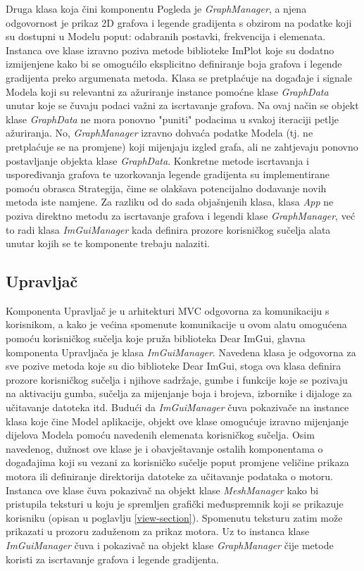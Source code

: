 \documentclass[times, utf8, diplomski]{fer}
\begin{document}
Druga klasa koja čini komponentu Pogleda je \textit{GraphManager}, a njena odgovornost je prikaz 2D grafova i legende gradijenta s obzirom na podatke koji su dostupni u Modelu poput: odabranih postavki, frekvencija i elemenata. Instanca ove klase izravno poziva metode biblioteke ImPlot koje su dodatno izmijenjene kako bi se omogućilo eksplicitno definiranje boja grafova i legende gradijenta preko argumenata metoda. Klasa se pretplaćuje na događaje i signale Modela koji su relevantni za ažuriranje instance pomoćne klase \textit{GraphData} unutar koje se čuvaju podaci važni za iscrtavanje grafova. Na ovaj način se objekt klase \textit{GraphData} ne mora ponovno "puniti" podacima u svakoj iteraciji petlje ažuriranja. No, \textit{GraphManager} izravno dohvaća podatke Modela (tj. ne pretplaćuje se na promjene) koji mijenjaju izgled grafa, ali ne zahtjevaju ponovno postavljanje objekta klase \textit{GraphData}. Konkretne metode iscrtavanja i uspoređivanja grafova te uzorkovanja legende gradijenta su implementirane pomoću obrasca Strategija, čime se olakšava potencijalno dodavanje novih metoda iste namjene. Za razliku od do sada objašnjenih klasa, klasa \textit{App} ne poziva direktno metodu za iscrtavanje grafova i legendi klase \textit{GraphManager}, već to radi klasa \textit{ImGuiManager} kada definira prozore korisničkog sučelja alata unutar kojih se te komponente trebaju nalaziti.\\

\subsection{Upravljač}

Komponenta Upravljač je u arhitekturi MVC odgovorna za komunikaciju s korisnikom, a kako je većina spomenute komunikacije u ovom alatu omogućena pomoću korisničkog sučelja koje pruža biblioteka Dear ImGui, glavna komponenta Upravljača je klasa \textit{ImGuiManager}. Navedena klasa je odgovorna za sve pozive metoda koje su dio biblioteke Dear ImGui, stoga ova klasa definira prozore korisničkog sučelja i njihove sadržaje, gumbe i funkcije koje se pozivaju na aktivaciju gumba, sučelja za mijenjanje boja i brojeva, izbornike i dijaloge za učitavanje datoteka itd. Budući da \textit{ImGuiManager} čuva pokazivače na instance klasa koje čine Model aplikacije, objekt ove klase omogućuje izravno mijenjanje dijelova Modela pomoću navedenih elemenata korisničkog sučelja. Osim navedenog, dužnost ove klase je i obavještavanje ostalih komponentama o događajima koji su vezani za korisničko sučelje poput promjene veličine prikaza motora ili definiranje direktorija datoteke za učitavanje podataka o motoru. Instanca ove klase čuva pokazivač na objekt klase \textit{MeshManager} kako bi pristupila teksturi u koju je spremljen grafički međuspremnik koji se prikazuje korisniku (opisan u poglavlju \ref{view-section}). Spomenutu teksturu zatim može prikazati u prozoru zaduženom za prikaz motora. Uz to instanca klase \textit{ImGuiManager} čuva i pokazivač na objekt klase \textit{GraphManager} čije metode koristi za iscrtavanje grafova i legende gradijenta.\\
\end{document}
